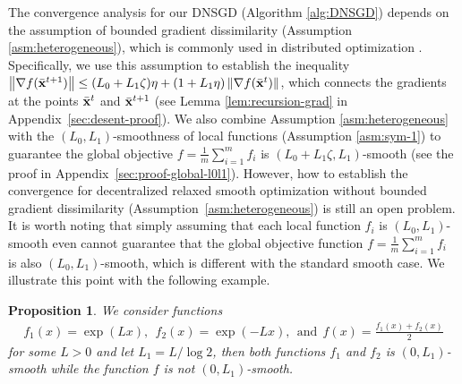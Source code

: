 \documentclass[sigconf]{acmart}
\newcommand{\Norm}[1]{\left\| #1 \right\|}
\def\vx{{\bf{x}}}
\theoremstyle{plain}
\newtheorem{prop}{Proposition}
\def\bx{{\bar\vx}}
\begin{document}
The convergence analysis for our DNSGD (Algorithm \ref{alg:DNSGD}) depends on the assumption of bounded gradient dissimilarity (Assumption \ref{asm:heterogeneous}), which is commonly used in distributed optimization \citep{woodworth2020minibatch,gorbunov2021local,assran2019stochastic,lian2017can}.
Specifically, we use this assumption to establish the inequality 
$\Norm{\nabla f(\bx^{t+1})} \leq (L_0+L_1\zeta)\eta + \left(1+L_1\eta\right)\Norm{\nabla f(\bx^{t})}$,
which connects the gradients at the points $\bx^{t}$ and $\bx^{t+1}$ 
(see Lemma \ref{lem:recursion-grad} in Appendix~\ref{sec:desent-proof}).
We also combine Assumption \ref{asm:heterogeneous} with the $(L_0,L_1)$-smoothness of local functions (Assumption \ref{asm:sym-1}) to guarantee the global objective $f=\frac{1}{m}\sum_{i=1}^m f_i$ is $(L_0+L_1\zeta,L_1)$-smooth 
(see the proof in Appendix~\ref{sec:proof-global-l0l1}).
However, how to establish the convergence for decentralized relaxed smooth optimization without bounded gradient dissimilarity (Assumption~\ref{asm:heterogeneous}) is still an open problem.
It is worth noting that simply assuming that each local function $f_i$ is $(L_0, L_1)$-smooth even cannot guarantee that the global objective function $f=\frac{1}{m}\sum_{i=1}^m f_i$ is also $(L_0, L_1)$-smooth, which is different with the standard smooth case.
We illustrate this point with the following example.

\begin{prop}\label{prop:example}
We consider functions
\begin{align*}
    f_1(x) = \exp(Lx),~~f_2(x) = \exp(-Lx),~~\text{and}~~f(x) = \frac{f_1(x)+f_2(x)}{2}
\end{align*}
for some $L>0$ and let $L_1=L/\log 2$, then both functions $f_1$ and $f_2$ is $(0,L_1)$-smooth while the function $f$ is not $(0,L_1)$-smooth.
\end{prop}
\end{document}
